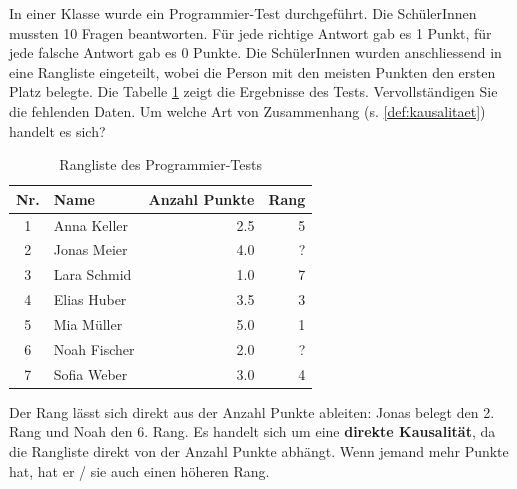 \begin{myexercise}
    In einer Klasse wurde ein Programmier-Test durchgeführt. Die SchülerInnen mussten 10 Fragen beantworten. Für jede richtige Antwort gab es 1 Punkt, für jede falsche Antwort gab es 0 Punkte. Die SchülerInnen wurden anschliessend in eine Rangliste eingeteilt, wobei die Person mit den meisten Punkten den ersten Platz belegte. Die Tabelle \ref{tab:rangliste} zeigt die Ergebnisse des Tests. Vervollständigen Sie die fehlenden Daten. Um welche Art von Zusammenhang (s. \cref{def:kausalitaet}) handelt es sich?
    \begin{table}[H]
        \centering
        \begin{tabular}{clrr}
            \midrule
            Nr. & Name         & Anzahl Punkte & Rang \\
            \midrule
            1   & Anna Keller  & 2.5           & 5    \\
            2   & Jonas Meier  & 4.0           & ?    \\
            3   & Lara Schmid  & 1.0           & 7    \\
            4   & Elias Huber  & 3.5           & 3    \\
            5   & Mia Müller   & 5.0           & 1    \\
            6   & Noah Fischer & 2.0           & ?    \\
            7   & Sofia Weber  & 3.0           & 4    \\
            \midrule
        \end{tabular}
        \caption{Rangliste des Programmier-Tests}
        \label{tab:rangliste}
    \end{table}
    \begin{myanswer}
        Der Rang lässt sich direkt aus der Anzahl Punkte ableiten: Jonas belegt den 2. Rang und Noah den 6. Rang. Es handelt sich um eine \textbf{direkte Kausalität}, da die Rangliste direkt von der Anzahl Punkte abhängt. Wenn jemand mehr Punkte hat, hat er / sie auch einen höheren Rang.
    \end{myanswer}
\end{myexercise}

